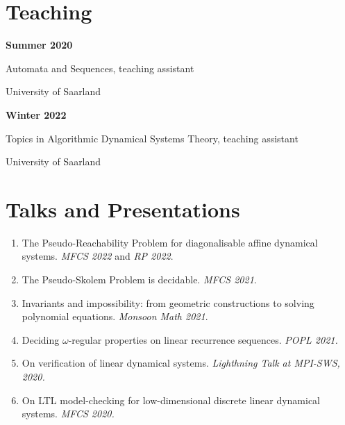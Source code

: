 \documentclass{article}
\begin{document}
	\section*{Teaching}
	\noindent\begin{minipage}{0.3\textwidth}
		\hspace{0.5cm} \textbf{Summer 2020}
	\end{minipage}
	\begin{minipage}{0.7\textwidth}
		Automata and Sequences, teaching assistant 
		
		University of Saarland
	\end{minipage}

	\vspace{0.3cm}
	
	\noindent\begin{minipage}{0.3\textwidth}
		\hspace{0.5cm} \textbf{Winter 2022}
	\end{minipage}
	\begin{minipage}{0.7\textwidth}
		Topics in Algorithmic Dynamical Systems Theory, teaching assistant 
		
		University of Saarland
	\end{minipage}

	\section*{Talks and Presentations}
	\begin{enumerate}
		\item The Pseudo-Reachability Problem for diagonalisable affine dynamical systems. \emph{MFCS 2022} and \emph{RP 2022}.
		\item The Pseudo-Skolem Problem is decidable. \emph{MFCS 2021}.
		\item Invariants and impossibility: from geometric constructions to solving polynomial equations. \emph{Monsoon Math 2021}.
		\item Deciding $\omega$-regular properties on linear recurrence sequences. \emph{POPL 2021.}
		\item On verification of linear dynamical systems. \emph{Lighthning Talk at MPI-SWS, 2020.}
		\item  On LTL model-checking for low-dimensional discrete
		linear dynamical systems. \emph{MFCS 2020.}
	\end{enumerate}
\end{document}
